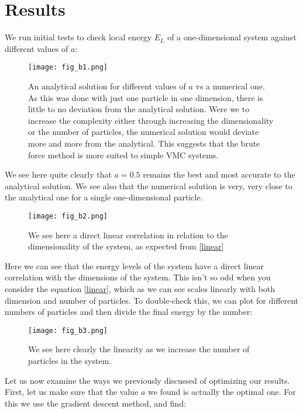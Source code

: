 \documentclass{article}
\begin{document}
\section{Results}
We run initial tests to check local energy $E_L$ of a one-dimensional system against different values of $a$:
\begin{figure}[ht!]
    \centering
    \texttt{[image: fig\_b1.png]}
    \caption{An analytical solution for different values of $a$ vs a numerical one. \newline
    As this was done with just one particle in one dimension, there is little to no deviation from the analytical solution. \newline Were we to increase the complexity either through increasing the dimensionality or the number of particles, the numerical solution would deviate more and more from the analytical. This suggests that the brute force method is more suited to simple VMC systems.}
    \label{fig:my_label}
\end{figure} \newline
We see here quite clearly that $a = 0.5$ remains the best and most accurate to the analytical solution. We see also that the numerical solution is very, very close to the analytical one for a single one-dimensional particle.
\begin{figure}[ht!]
    \centering
    \texttt{[image: fig\_b2.png]}
    \caption{We see here a direct linear correlation in relation to the dimensionality of the system, as expected from \ref{linear}}
    \label{fig2}
\end{figure} \newline
Here we can see that the energy levels of the system have a direct linear correlation with the dimensions of the system. This isn't so odd when you consider the equation \ref{linear}, which as we can see scales linearly with both dimension and number of particles. To double-check this, we can plot for different numbers of particles and then divide the final energy by the number:
\begin{figure}[ht!]
    \centering
    \texttt{[image: fig\_b3.png]}
    \caption{We see here clearly the linearity as we increase the number of particles in the system.}
    \label{fig3}
\end{figure} \newline
Let us now examine the ways we previously discussed of optimizing our results. First, let us make sure that the value $a$ we found is actually the optimal one. For this we use the gradient descent method, and find:
\end{document}
